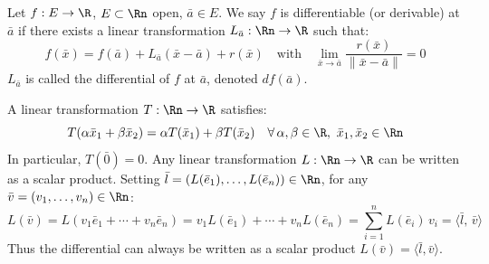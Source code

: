 \begin{definition}
    Let $f: E \to \R$, $E \subset \Rn$ open, $\bar{a} \in E$. We say $f$ is differentiable (or derivable) at $\bar{a}$ if there exists a linear transformation $L_{\bar{a}}: \Rn \to \R$ such that:
    \[
        f(\bar{x}) = f(\bar{a}) + L_{\bar{a}}(\bar{x} - \bar{a}) + r(\bar{x}) \quad \text{with} \quad \lim_{\bar{x} \to \bar{a}} \frac{r(\bar{x})}{\|\bar{x} - \bar{a}\|} = 0
    \]
    $L_{\bar{a}}$ is called the differential of $f$ at $\bar{a}$, denoted $df(\bar{a})$.
\end{definition}
A linear transformation $T: \Rn \to \R$ satisfies:
\[
    T(\alpha\bar{x}_1 + \beta\bar{x}_2) = \alpha T(\bar{x}_1) + \beta T(\bar{x}_2) \quad \forall\, \alpha, \beta \in \R,\ \bar{x}_1, \bar{x}_2 \in \Rn
\]
In particular, $T(\bar{0}) = 0$. Any linear transformation $L: \Rn \to \R$ can be written as a scalar product. Setting $\bar{l} = (L(\bar{e}_1), \ldots, L(\bar{e}_n)) \in \Rn$, for any $\bar{v} = (v_1, \ldots, v_n) \in \Rn$:
\[
    L(\bar{v}) = L(v_1\bar{e}_1 + \cdots + v_n\bar{e}_n) = v_1 L(\bar{e}_1) + \cdots + v_n L(\bar{e}_n) = \sum_{i=1}^n L(\bar{e}_i)\, v_i = \langle \bar{l},\, \bar{v} \rangle
\]
Thus the differential can always be written as a scalar product $L(\bar{v}) = \langle \bar{l}, \bar{v} \rangle$.
